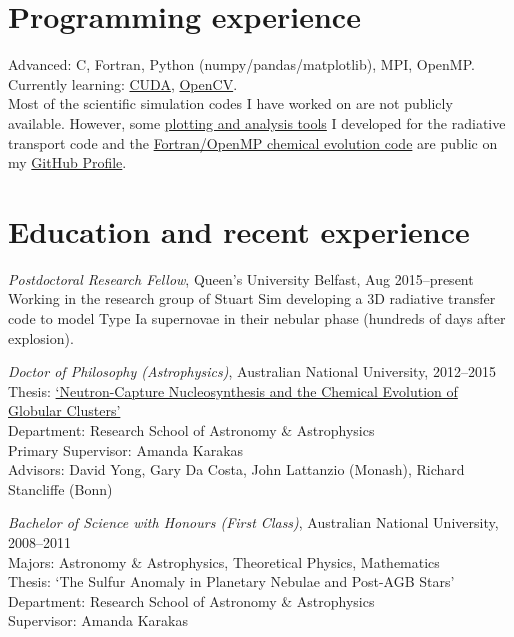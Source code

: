 \documentclass[11pt]{res} %
\begin{document}
\begin{resume}
\section{Programming experience}
  Advanced: C, Fortran, Python (numpy/pandas/matplotlib), MPI, OpenMP.\\
  Currently learning: \href{https://github.com/lukeshingles/cuda-examples}{CUDA}, \href{https://github.com/lukeshingles/opencv-examples}{OpenCV}.\\
  Most of the scientific simulation codes I have worked on are not publicly available. However, some \href{https://github.com/lukeshingles/artistools}{plotting and analysis tools} I developed for the radiative transport code and the \href{https://github.com/lukeshingles/evelchemevol}{Fortran/OpenMP chemical evolution code} are public on my \href{https://github.com/lukeshingles}{GitHub Profile}.

\section{Education and recent experience}
  {\it Postdoctoral Research Fellow}, Queen's University Belfast, Aug 2015--present\\
  Working in the research group of Stuart Sim developing a 3D radiative transfer code to model Type Ia supernovae in their nebular phase (hundreds of days after explosion).

  {\it Doctor of Philosophy (Astrophysics)}, Australian National University, 2012--2015\\
  Thesis: \href{https://openresearch-repository.anu.edu.au/handle/1885/16507}{`Neutron-Capture Nucleosynthesis and the Chemical Evolution of Globular Clusters'}\\
  Department: Research School of Astronomy \& Astrophysics\\
  Primary Supervisor: Amanda Karakas\\
  Advisors: David Yong, Gary Da Costa, John Lattanzio (Monash), Richard Stancliffe (Bonn)

  {\it Bachelor of Science with Honours (First Class)}, Australian National University, 2008--2011\\
  Majors: Astronomy \& Astrophysics, Theoretical Physics, Mathematics\\
  Thesis: `The Sulfur Anomaly in Planetary Nebulae and Post-AGB Stars'\\
  Department: Research School of Astronomy \& Astrophysics\\
  Supervisor: Amanda Karakas


\end{resume}
\end{document}
